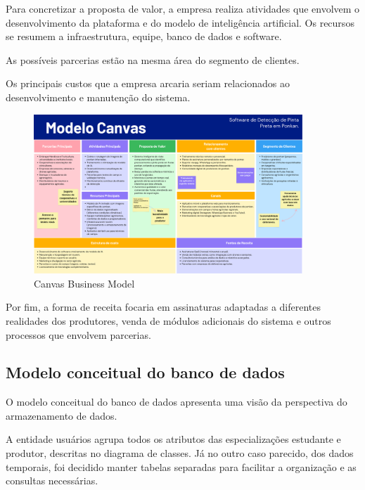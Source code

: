 \documentclass[
  a4paper,%
  12pt,%
  english,%
  brazilian,%
]{article}
\begin{document}
    Para concretizar a proposta de valor, a empresa realiza atividades que envolvem o desenvolvimento da plataforma e do modelo de inteligência artificial. Os recursos se resumem a infraestrutura, equipe, banco de dados e software. 

    As possíveis parcerias estão na mesma área do segmento de clientes.

    Os principais custos que a empresa arcaria seriam relacionados ao desenvolvimento e manutenção do sistema. 
    


        \begin{figure}[h]
\centering
\caption{Canvas Business Model}%
\label{fig:diagrama-objetos}
 \includegraphics[width=0.9\textwidth]{Logos/canvas.png}
\end{figure}

Por fim, a forma de receita focaria em assinaturas adaptadas a diferentes realidades dos produtores, venda de módulos adicionais do sistema e outros processos que envolvem parcerias.

\subsection*{Modelo conceitual do banco de dados}

    O modelo conceitual do banco de dados apresenta uma visão da perspectiva do armazenamento de dados.

    A entidade usuários agrupa todos os atributos das especializações estudante e produtor, descritas no diagrama de classes. Já no outro caso parecido, dos dados temporais, foi decidido manter tabelas separadas para facilitar a organização e as consultas necessárias.
    
\end{document}
